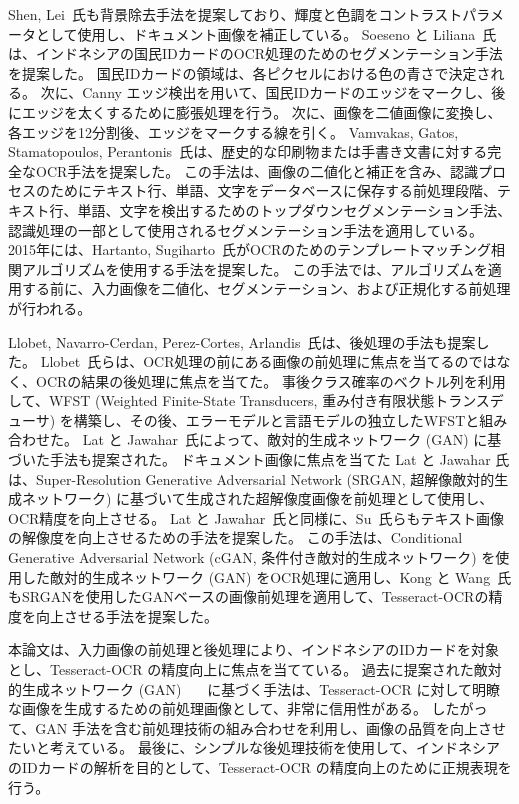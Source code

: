 \documentclass[uplatex, twocolumn,10pt]{jsarticle}
\begin{document}
Shen, Lei~\cite{bib13}氏も背景除去手法を提案しており、輝度と色調をコントラストパラメータとして使用し、ドキュメント画像を補正している。
Soeseno と Liliana~\cite{bib6}氏は、インドネシアの国民IDカードのOCR処理のためのセグメンテーション手法を提案した。
国民IDカードの領域は、各ピクセルにおける色の青さで決定される。
次に、Canny エッジ検出を用いて、国民IDカードのエッジをマークし、後にエッジを太くするために膨張処理を行う。
次に、画像を二値画像に変換し、各エッジを12分割後、エッジをマークする線を引く。
Vamvakas, Gatos, Stamatopoulos, Perantonis~\cite{bib14}氏は、歴史的な印刷物または手書き文書に対する完全なOCR手法を提案した。
この手法は、画像の二値化と補正を含み、認識プロセスのためにテキスト行、単語、文字をデータベースに保存する前処理段階、テキスト行、単語、文字を検出するためのトップダウンセグメンテーション手法、認識処理の一部として使用されるセグメンテーション手法を適用している。
2015年には、Hartanto, Sugiharto~\cite{bib15}氏がOCRのためのテンプレートマッチング相関アルゴリズムを使用する手法を提案した。
この手法では、アルゴリズムを適用する前に、入力画像を二値化、セグメンテーション、および正規化する前処理が行われる。

Llobet, Navarro-Cerdan, Perez-Cortes, Arlandis~\cite{bib2}氏は、後処理の手法も提案した。
Llobet~\cite{bib2}氏らは、OCR処理の前にある画像の前処理に焦点を当てるのではなく、OCRの結果の後処理に焦点を当てた。
事後クラス確率のベクトル列を利用して、WFST (Weighted Finite-State Transducers, 重み付き有限状態トランスデューサ) を構築し、その後、エラーモデルと言語モデルの独立したWFSTと組み合わせた。
Lat と Jawahar~\cite{bib9}氏によって、敵対的生成ネットワーク (GAN) に基づいた手法も提案された。
ドキュメント画像に焦点を当てた Lat と Jawahar 氏は、Super-Resolution Generative Adversarial Network (SRGAN, 超解像敵対的生成ネットワーク) に基づいて生成された超解像度画像を前処理として使用し、OCR精度を向上させる。
Lat と Jawahar~\cite{bib9}氏と同様に、Su~\cite{bib10}氏らもテキスト画像の解像度を向上させるための手法を提案した。
この手法は、Conditional Generative Adversarial Network (cGAN, 条件付き敵対的生成ネットワーク) を使用した敵対的生成ネットワーク (GAN) をOCR処理に適用し、Kong と Wang~\cite{bib11}氏もSRGANを使用したGANベースの画像前処理を適用して、Tesseract-OCRの精度を向上させる手法を提案した。

本論文は、入力画像の前処理と後処理により、インドネシアのIDカードを対象とし、Tesseract-OCR の精度向上に焦点を当てている。
過去に提案された敵対的生成ネットワーク (GAN)~\cite{bib9}~\cite{bib10}~\cite{bib11} に基づく手法は、Tesseract-OCR に対して明瞭な画像を生成するための前処理画像として、非常に信用性がある。
したがって、GAN 手法を含む前処理技術の組み合わせを利用し、画像の品質を向上させたいと考えている。
最後に、シンプルな後処理技術を使用して、インドネシアのIDカードの解析を目的として、Tesseract-OCR の精度向上のために正規表現を行う。
\end{document}
